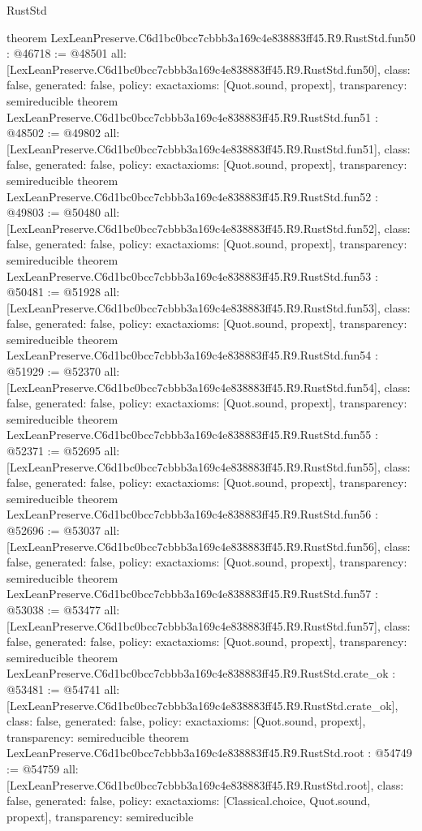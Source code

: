 \begin{lexlean}{RustStd}
\begin{coremodule}
{}
theorem LexLeanPreserve.C6d1bc0bcc7cbbb3a169c4e838883ff45.R9.RustStd.fun50 : @46718 := @48501 {
  all: [LexLeanPreserve.C6d1bc0bcc7cbbb3a169c4e838883ff45.R9.RustStd.fun50],
  class: false,
  generated: false,
  policy: exact{axioms: [Quot.sound, propext]},
  transparency: semireducible
}
theorem LexLeanPreserve.C6d1bc0bcc7cbbb3a169c4e838883ff45.R9.RustStd.fun51 : @48502 := @49802 {
  all: [LexLeanPreserve.C6d1bc0bcc7cbbb3a169c4e838883ff45.R9.RustStd.fun51],
  class: false,
  generated: false,
  policy: exact{axioms: [Quot.sound, propext]},
  transparency: semireducible
}
theorem LexLeanPreserve.C6d1bc0bcc7cbbb3a169c4e838883ff45.R9.RustStd.fun52 : @49803 := @50480 {
  all: [LexLeanPreserve.C6d1bc0bcc7cbbb3a169c4e838883ff45.R9.RustStd.fun52],
  class: false,
  generated: false,
  policy: exact{axioms: [Quot.sound, propext]},
  transparency: semireducible
}
theorem LexLeanPreserve.C6d1bc0bcc7cbbb3a169c4e838883ff45.R9.RustStd.fun53 : @50481 := @51928 {
  all: [LexLeanPreserve.C6d1bc0bcc7cbbb3a169c4e838883ff45.R9.RustStd.fun53],
  class: false,
  generated: false,
  policy: exact{axioms: [Quot.sound, propext]},
  transparency: semireducible
}
theorem LexLeanPreserve.C6d1bc0bcc7cbbb3a169c4e838883ff45.R9.RustStd.fun54 : @51929 := @52370 {
  all: [LexLeanPreserve.C6d1bc0bcc7cbbb3a169c4e838883ff45.R9.RustStd.fun54],
  class: false,
  generated: false,
  policy: exact{axioms: [Quot.sound, propext]},
  transparency: semireducible
}
theorem LexLeanPreserve.C6d1bc0bcc7cbbb3a169c4e838883ff45.R9.RustStd.fun55 : @52371 := @52695 {
  all: [LexLeanPreserve.C6d1bc0bcc7cbbb3a169c4e838883ff45.R9.RustStd.fun55],
  class: false,
  generated: false,
  policy: exact{axioms: [Quot.sound, propext]},
  transparency: semireducible
}
theorem LexLeanPreserve.C6d1bc0bcc7cbbb3a169c4e838883ff45.R9.RustStd.fun56 : @52696 := @53037 {
  all: [LexLeanPreserve.C6d1bc0bcc7cbbb3a169c4e838883ff45.R9.RustStd.fun56],
  class: false,
  generated: false,
  policy: exact{axioms: [Quot.sound, propext]},
  transparency: semireducible
}
theorem LexLeanPreserve.C6d1bc0bcc7cbbb3a169c4e838883ff45.R9.RustStd.fun57 : @53038 := @53477 {
  all: [LexLeanPreserve.C6d1bc0bcc7cbbb3a169c4e838883ff45.R9.RustStd.fun57],
  class: false,
  generated: false,
  policy: exact{axioms: [Quot.sound, propext]},
  transparency: semireducible
}
theorem LexLeanPreserve.C6d1bc0bcc7cbbb3a169c4e838883ff45.R9.RustStd.crate_ok : @53481 := @54741 {
  all: [LexLeanPreserve.C6d1bc0bcc7cbbb3a169c4e838883ff45.R9.RustStd.crate_ok],
  class: false,
  generated: false,
  policy: exact{axioms: [Quot.sound, propext]},
  transparency: semireducible
}
theorem LexLeanPreserve.C6d1bc0bcc7cbbb3a169c4e838883ff45.R9.RustStd.root : @54749 := @54759 {
  all: [LexLeanPreserve.C6d1bc0bcc7cbbb3a169c4e838883ff45.R9.RustStd.root],
  class: false,
  generated: false,
  policy: exact{axioms: [Classical.choice, Quot.sound, propext]},
  transparency: semireducible
}


\end{coremodule}
\end{lexlean}
